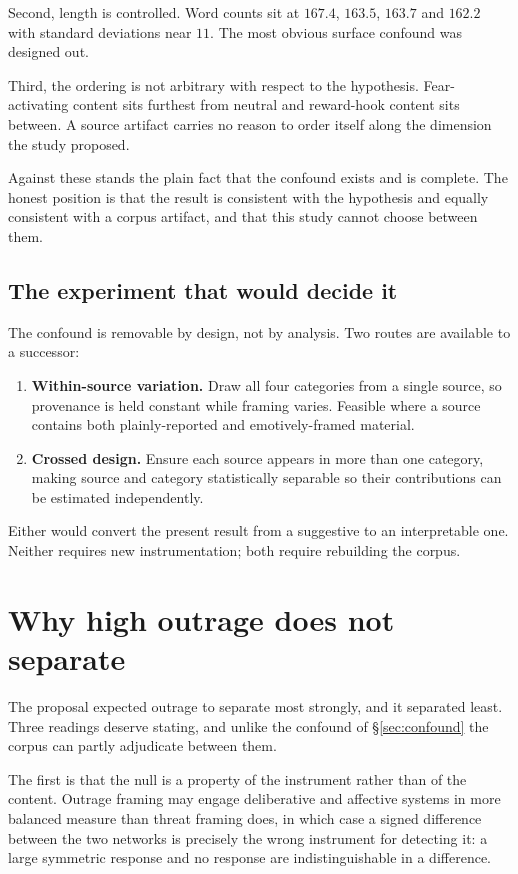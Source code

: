 Second, length is controlled. Word counts sit at $167.4$, $163.5$, $163.7$ and $162.2$ with
standard deviations near $11$. The most obvious surface confound was designed out.

Third, the ordering is not arbitrary with respect to the hypothesis. Fear-activating content
sits furthest from neutral and reward-hook content sits between. A source artifact carries no
reason to order itself along the dimension the study proposed.

Against these stands the plain fact that the confound exists and is complete. The honest
position is that the result is consistent with the hypothesis and equally consistent with a
corpus artifact, and that this study cannot choose between them.

\subsection{The experiment that would decide it}

The confound is removable by design, not by analysis. Two routes are available to a
successor:

\begin{enumerate}
\item \textbf{Within-source variation.} Draw all four categories from a single source, so
provenance is held constant while framing varies. Feasible where a source contains both
plainly-reported and emotively-framed material.
\item \textbf{Crossed design.} Ensure each source appears in more than one category, making
source and category statistically separable so their contributions can be estimated
independently.
\end{enumerate}

Either would convert the present result from a suggestive to an interpretable one. Neither
requires new instrumentation; both require rebuilding the corpus.

\section{Why high outrage does not separate}
\label{sec:outrage}

The proposal expected outrage to separate most strongly, and it separated least. Three
readings deserve stating, and unlike the confound of \S\ref{sec:confound} the corpus can
partly adjudicate between them.

The first is that the null is a property of the instrument rather than of the content.
Outrage framing may engage deliberative and affective systems in more balanced measure than
threat framing does, in which case a signed difference between the two networks is precisely
the wrong instrument for detecting it: a large symmetric response and no response are
indistinguishable in a difference.

